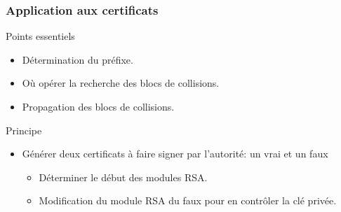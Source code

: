 			
			
			
			
	\begin{frame}
		\frametitle{Application aux certificats}
		\begin{block}{Points essentiels}
		  \begin{itemize}
		  \item D\'etermination du pr\'efixe.
		  \item O\`u op\'erer la recherche des blocs de collisions.
		  \item Propagation des blocs de collisions.
		  \end{itemize}
		\end{block}
		
		\begin{block}{Principe}
		  \begin{itemize}
		  \item G\'en\'erer deux certificats \`a faire signer par l'autorit\'e: un vrai et un faux
		    \begin{itemize}
		    \item D\'eterminer le d\'ebut des modules RSA.
		    \item Modification du module RSA du faux pour en contr\^oler la cl\'e priv\'ee.
		    \end{itemize}
		  \end{itemize}
		\end{block}
		
	\end{frame}
